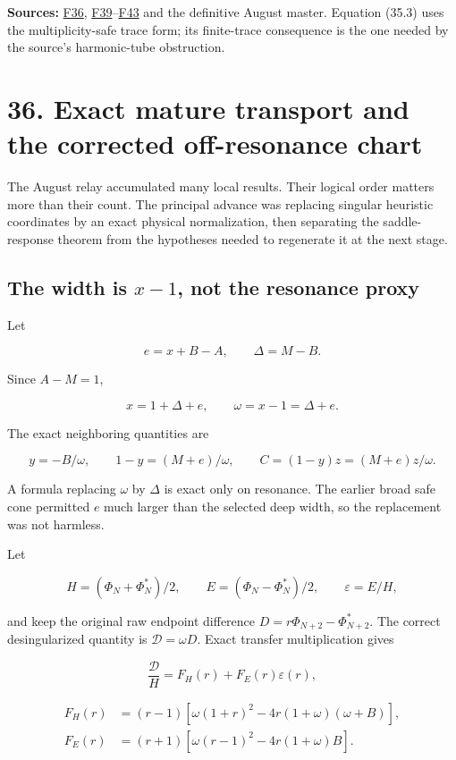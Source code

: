 \documentclass[
  10pt,
  a4paper,
  10pt,
  oneside,
  openany]{book}
\begin{document}
\textbf{Sources:} \hyperref[source-f36]{F36},
\hyperref[source-f39]{F39}--\hyperref[source-f43]{F43} and the
definitive August master. Equation (35.3) uses the multiplicity-safe
trace form; its finite-trace consequence is the one needed by the
source's harmonic-tube obstruction.

\section{36. Exact mature transport and the corrected off-resonance
chart}\label{ch-mature}

The August relay accumulated many local results. Their logical order
matters more than their count. The principal advance was replacing
singular heuristic coordinates by an exact physical normalization, then
separating the saddle-response theorem from the hypotheses needed to
regenerate it at the next stage.

\subsection{\texorpdfstring{The width is \(x-1\), not the resonance
proxy}{The width is x-1, not the resonance proxy}}\label{the-width-is-x-1-not-the-resonance-proxy}

Let

\[
 e=x+B-A,\qquad\Delta=M-B.
\]

Since \(A-M=1\),

\[
 x=1+\Delta+e,\qquad\omega=x-1=\Delta+e.
 \tag{36.1}\label{eq:36.1}
\]

The exact neighboring quantities are

\[
 y=-B/\omega,\qquad1-y=(M+e)/\omega,
 \qquad C=(1-y)z=(M+e)z/\omega.
\]

A formula replacing \(\omega\) by \(\Delta\) is exact only on resonance.
The earlier broad safe cone permitted \(e\) much larger than the
selected deep width, so the replacement was not harmless.

Let

\[
 H=(\Phi_N+\Phi_N^*)/2,\qquad
 E=(\Phi_N-\Phi_N^*)/2,\qquad\varepsilon=E/H,
\]

and keep the original raw endpoint difference
\(D=r\Phi_{N+2}-\Phi_{N+2}^*\). The correct desingularized quantity is
\(\mathscr D=\omega D\). Exact transfer multiplication gives

\[
 \frac{\mathscr D}{H}=F_H(r)+F_E(r)\varepsilon(r),
 \tag{36.2}\label{eq:36.2}
\]

\[
\begin{aligned}
F_H(r)&=(r-1)[\omega(1+r)^2-4r(1+\omega)(\omega+B)],\\
F_E(r)&=(r+1)[\omega(r-1)^2-4r(1+\omega)B].
\end{aligned}
\]
\end{document}
